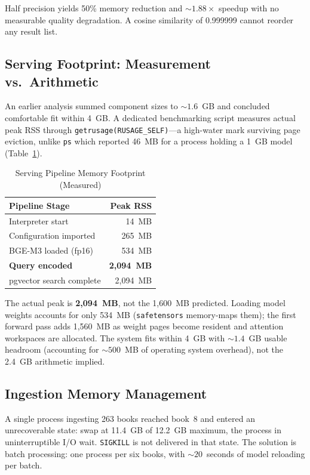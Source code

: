 \documentclass[conference]{IEEEtran}
\begin{document}
Half precision yields 50\% memory reduction and ${\sim}1.88\times$ speedup with no measurable quality degradation. A cosine similarity of 0.999999 cannot reorder any result list.

\subsection{Serving Footprint: Measurement vs.\ Arithmetic}
An earlier analysis summed component sizes to ${\sim}1.6$~GB and concluded comfortable fit within 4~GB. A dedicated benchmarking script measures actual peak RSS through \texttt{getrusage(RUSAGE\_SELF)}---a high-water mark surviving page eviction, unlike \texttt{ps} which reported 46~MB for a process holding a 1~GB model (Table~\ref{tab:footprint}).

\begin{table}[htbp]
\caption{Serving Pipeline Memory Footprint (Measured)}
\label{tab:footprint}
\centering
\begin{tabular}{@{}lr@{}}
\toprule
\textbf{Pipeline Stage} & \textbf{Peak RSS} \\
\midrule
Interpreter start & 14~MB \\
Configuration imported & 265~MB \\
BGE-M3 loaded (fp16) & 534~MB \\
\textbf{Query encoded} & \textbf{2,094~MB} \\
pgvector search complete & 2,094~MB \\
\bottomrule
\end{tabular}
\end{table}

The actual peak is \textbf{2,094~MB}, not the 1,600~MB predicted. Loading model weights accounts for only 534~MB (\texttt{safetensors} memory-maps them); the first forward pass adds 1,560~MB as weight pages become resident and attention workspaces are allocated. The system fits within 4~GB with ${\sim}1.4$~GB usable headroom (accounting for ${\sim}500$~MB of operating system overhead), not the 2.4~GB arithmetic implied.

\subsection{Ingestion Memory Management}
A single process ingesting 263 books reached book~8 and entered an unrecoverable state: swap at 11.4~GB of 12.2~GB maximum, the process in uninterruptible I/O wait. \texttt{SIGKILL} is not delivered in that state. The solution is batch processing: one process per six books, with ${\sim}20$~seconds of model reloading per batch.
\end{document}
